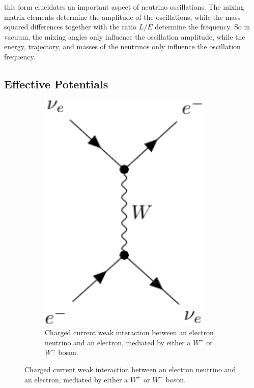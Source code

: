 this form elucidates an important aspect of neutrino oscillations. The mixing matrix elements
determine the amplitude of the oscillations, while the mass-squared differences together with the ratio $L/E$ determine the 
frequency. So in vacuum, the mixing angles only influence the oscillation amplitude, while the energy, trajectory, and masses of
the neutrinos only influence the oscillation frequency.

\subsection{Effective Potentials}

\begin{figure}
    \centering
    \begin{subfigure}{0.3\textwidth}
        \includegraphics[width=0.9\textwidth]{figures/w-boson.pdf} 
        \caption{Charged current weak interaction between an electron neutrino and an electron,
        mediated by either a $W^+$ or $W^-$ boson.}
    \end{subfigure}

\end{figure}
